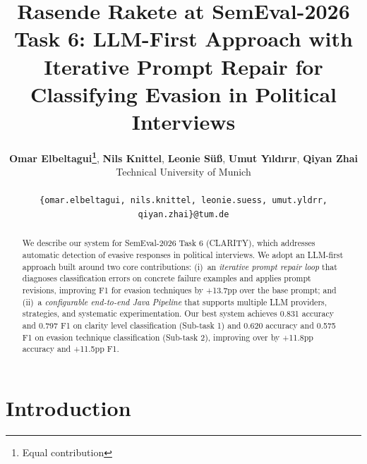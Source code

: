 \documentclass[11pt]{article}
\title{Rasende Rakete at SemEval-2026 Task 6: LLM-First Approach with Iterative Prompt Repair for Classifying Evasion in Political Interviews}
\author{
 \textbf{Omar Elbeltagui\thanks{Equal contribution}},
 \textbf{Nils Knittel\footnotemark[1]},
 \textbf{Leonie Süß\footnotemark[1]},
 \textbf{Umut Yıldırır\footnotemark[1]},
 \textbf{Qiyan Zhai\footnotemark[1]}
\\
 Technical University of Munich
\\
\\
 \small{
   \texttt{\{omar.elbeltagui, nils.knittel, leonie.suess, umut.yldrr, qiyan.zhai\}@tum.de}
   }
}
\begin{document}
\maketitle
\begin{abstract}
We describe our system for SemEval-2026 Task 6 (CLARITY), which addresses automatic detection of evasive responses in political interviews.
We adopt an LLM-first approach built around two core contributions:
(i)~an \emph{iterative prompt repair loop} that diagnoses classification errors on concrete failure examples and applies prompt revisions, improving F1 for evasion techniques by +13.7pp over the base prompt; and
(ii)~a \emph{configurable end-to-end Java Pipeline} that supports multiple LLM providers, strategies, and systematic experimentation.
Our best system achieves 0.831 accuracy and 0.797 F1 on clarity level classification (Sub-task 1) and 0.620 accuracy and 0.575 F1 on evasion technique classification (Sub-task 2), improving over \citet{thomas2024isaidthatdataset} by +11.8pp accuracy and +11.5pp F1.
\end{abstract}

\section{Introduction}
\end{document}
